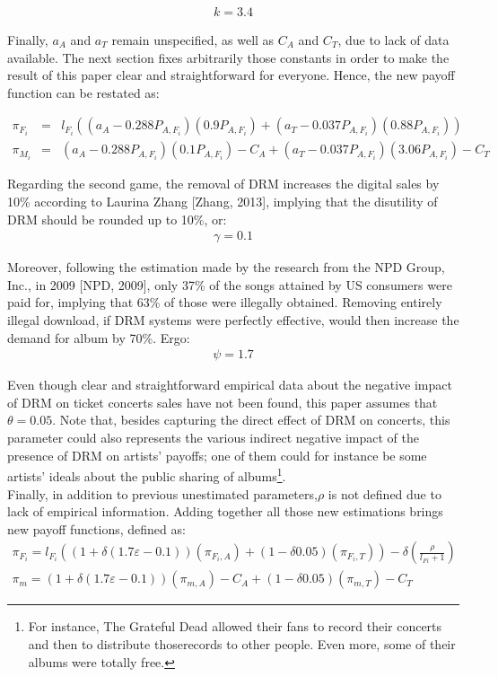 \documentclass[a4paper,12pt]{article}
\numberwithin{equation}{section}
\begin{document}
\begin{eqnarray*}
k=3.4
\end{eqnarray*}

Finally, $a_{A}$ and $a_{T}$ remain unspecified, as well as $C_{A}$ and
$C_{T}$, due to lack of data available. The next section fixes arbitrarily
those constants in order to make the result of this paper clear and
straightforward for everyone. Hence, the new payoff function can be
restated as:

\begin{eqnarray*}
\pi_{F_{i}} & = & l_{F_{i}}((a_{A}-0.288P_{A,F_{i}})(0.9P_{A,F_{i}})+(a_{T}-0.037P_{A,F_{i}})(0.88P_{A,F_{i}}))\\
\pi_{M_i} & = & (a_{A}-0.288P_{A,F_{i}})(0.1P_{A,F_{i}})-C_{A}+(a_{T}-0.037P_{A,F_{i}})(3.06P_{A,F_{i}})-C_{T}
\end{eqnarray*}

Regarding the second game, the removal of DRM increases the digital
sales by 10\% according to Laurina Zhang {[}Zhang, 2013{]}, implying
that the disutility of DRM should be rounded up to 10\%, or:
\begin{eqnarray*}
\gamma=0.1
\end{eqnarray*}

Moreover, following the estimation made by the research from the NPD
Group, Inc., in 2009 {[}NPD, 2009{]}, only 37\% of the songs attained
by US consumers were paid for, implying that 63\% of those were illegally
obtained. Removing entirely illegal download, if DRM systems were
perfectly effective, would then increase the demand for album by 70\%.
Ergo:
\begin{eqnarray*}
\psi=1.7
\end{eqnarray*}

Even though clear and straightforward empirical data about the negative
impact of DRM on ticket concerts sales have not been found, this paper
assumes that $\theta=0.05$. Note that, besides capturing the direct
effect of DRM on concerts, this parameter could also represents the
various indirect negative impact of the presence of DRM on artists’
payoffs; one of them could for instance be some artists’ ideals about
the public sharing of albums\footnote{
For instance, The Grateful Dead allowed their fans to record their
concerts and then to distribute thoserecords to other people. Even
more, some of their albums were totally free.
}.\\

Finally, in addition to previous unestimated parameters,$\rho$ is
not defined due to lack of empirical information. Adding together
all those new estimations brings new payoff functions, defined as:
\begin{eqnarray*}
\pi_{F_{i}}=l_{F_{i}}((1+\delta(1.7\varepsilon-0.1))(\pi_{F_{i},A})+(1-\delta0.05)(\pi_{F_{i},T}))-\delta(\frac{\rho}{l_{Fi}+1})\\
\pi_{m}=(1+\delta(1.7\varepsilon-0.1))(\pi_{m,A})-C_{A}+(1-\delta0.05)(\pi_{m,T})-C_{T}
\end{eqnarray*}
\end{document}
